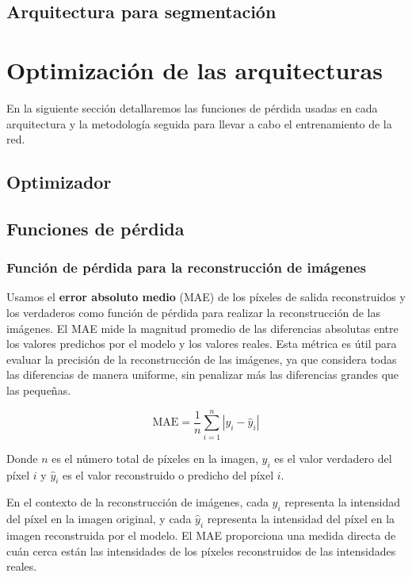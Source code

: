\subsection{Arquitectura para segmentación}

\section{Optimización de las arquitecturas}

En la siguiente sección detallaremos las funciones de pérdida usadas en cada arquitectura y la metodología seguida para llevar a cabo el entrenamiento de la red.

\subsection{Optimizador}

\subsection{Funciones de pérdida}

\subsubsection{Función de pérdida para la reconstrucción de imágenes}

Usamos el \textbf{error absoluto medio} (MAE) de los píxeles de salida reconstruidos y los verdaderos como función de pérdida para realizar la reconstrucción de las imágenes. El MAE mide la magnitud promedio de las diferencias absolutas entre los valores predichos por el modelo y los valores reales. Esta métrica es útil para evaluar la precisión de la reconstrucción de las imágenes, ya que considera todas las diferencias de manera uniforme, sin penalizar más las diferencias grandes que las pequeñas.

$$ \text{MAE} = \frac{1}{n} \sum_{i=1}^{n} \left| y_i - \hat{y}_i \right| $$ 

Donde $n$ es el número total de píxeles en la imagen, $y_i$ es el valor verdadero del píxel $i$ y $\hat{y}_i$ es el valor reconstruido o predicho del píxel $i$.

En el contexto de la reconstrucción de imágenes, cada $y_i$ representa la intensidad del píxel en la imagen original, y cada $\hat{y}_i$ representa la intensidad del píxel en la imagen reconstruida por el modelo. El MAE proporciona una medida directa de cuán cerca están las intensidades de los píxeles reconstruidos de las intensidades reales.

